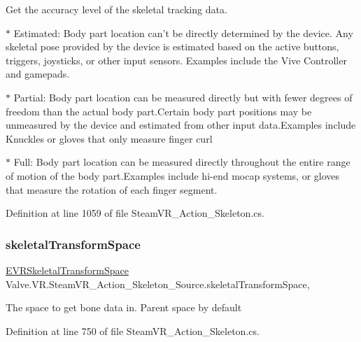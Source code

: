 Get the accuracy level of the skeletal tracking data. 

$\ast$ Estimated\+: Body part location can’t be directly determined by the device. Any skeletal pose provided by the device is estimated based on the active buttons, triggers, joysticks, or other input sensors. Examples include the Vive Controller and gamepads. 

$\ast$ Partial\+: Body part location can be measured directly but with fewer degrees of freedom than the actual body part.\+Certain body part positions may be unmeasured by the device and estimated from other input data.\+Examples include Knuckles or gloves that only measure finger curl 

$\ast$ Full\+: Body part location can be measured directly throughout the entire range of motion of the body part.\+Examples include hi-\/end mocap systems, or gloves that measure the rotation of each finger segment. 



Definition at line 1059 of file Steam\+V\+R\+\_\+\+Action\+\_\+\+Skeleton.\+cs.

\mbox{\label{class_valve_1_1_v_r_1_1_steam_v_r___action___skeleton___source_a8ae0c4bdc929e9487bd90a5c131df32a}} 
\subsubsection{\texorpdfstring{skeletalTransformSpace}{skeletalTransformSpace}}
{\footnotesize\ttfamily \mbox{\hyperlink{namespace_valve_1_1_v_r_a916744fb3fc7b8e8ba224fba9bee6de4}{E\+V\+R\+Skeletal\+Transform\+Space}} Valve.\+V\+R.\+Steam\+V\+R\+\_\+\+Action\+\_\+\+Skeleton\+\_\+\+Source.\+skeletal\+Transform\+Space\hspace{0.3cm}{\ttfamily [get]}, {\ttfamily [set]}}



The space to get bone data in. Parent space by default 



Definition at line 750 of file Steam\+V\+R\+\_\+\+Action\+\_\+\+Skeleton.\+cs.

\mbox{\label{class_valve_1_1_v_r_1_1_steam_v_r___action___skeleton___source_a7fa8a03fba2900cca13741074183a169}} 
